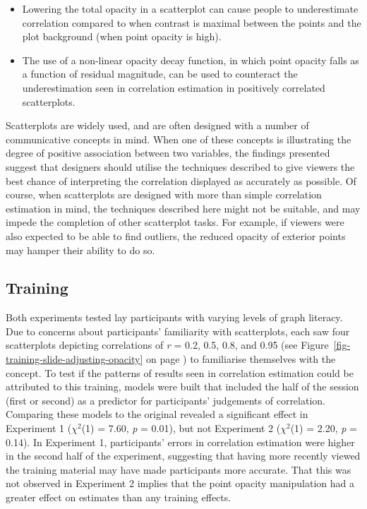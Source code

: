\documentclass[../main.tex]{subfiles}
\begin{document}
\begin{itemize}
\tightlist
\item
  Lowering the total opacity in a scatterplot can cause people to
  underestimate correlation compared to when contrast is maximal between
  the points and the plot background (when point opacity is high).
\item
  The use of a non-linear opacity decay function, in which point opacity
  falls as a function of residual magnitude, can be used to counteract
  the underestimation seen in correlation estimation in positively
  correlated scatterplots.
\end{itemize}

Scatterplots are widely used, and are often designed with a number of
communicative concepts in mind. When one of these concepts is
illustrating the degree of positive association between two variables,
the findings presented suggest that designers should utilise the
techniques described to give viewers the best chance of interpreting the
correlation displayed as accurately as possible. Of course, when
scatterplots are designed with more than simple correlation estimation
in mind, the techniques described here might not be suitable, and may
impede the completion of other scatterplot tasks. For example, if
viewers were also expected to be able to find outliers, the reduced
opacity of exterior points may hamper their ability to do so.

\subsection{Training}\label{training-adjusting-opacity}

Both experiments tested lay participants with varying levels of graph
literacy. Due to concerns about participants' familiarity with
scatterplots, each saw four scatterplots depicting correlations of
\emph{r} = 0.2, 0.5, 0.8, and 0.95 (see
Figure~\ref{fig-training-slide-adjusting-opacity} on page
\pageref{fig-training-slide-adjusting-opacity}) to familiarise
themselves with the concept. To test if the patterns of results seen in
correlation estimation could be attributed to this training, models were
built that included the half of the session (first or second) as a
predictor for participants' judgements of correlation. Comparing these
models to the original revealed a significant effect in Experiment 1
(\(\chi^2\)(1) = 7.60, \emph{p} = 0.01), but not Experiment 2
(\(\chi^2\)(1) = 2.20, \emph{p} = 0.14). In Experiment 1, participants'
errors in correlation estimation were higher in the second half of the
experiment, suggesting that having more recently viewed the training
material may have made participants more accurate. That this was not
observed in Experiment 2 implies that the point opacity manipulation had
a greater effect on estimates than any training effects.
\end{document}
